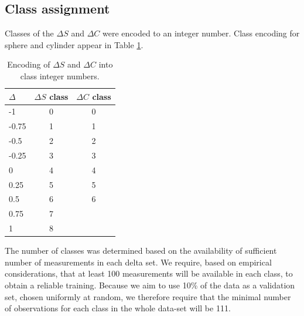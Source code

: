 \documentclass[article,twocolumn,preprint,10pt]{paper}%
\renewcommand{\(}{\left(}
\renewcommand{\)}{\right)}
\renewcommand{\[}{\left[}
\renewcommand{\]}{\right]}
\newcommand{\1}{\mbox{\boldmath$1$}}
\begin{document}
   \subsection{Class assignment}\label{subsection:ClassAssignment}
   Classes of the $\Delta S$ and $\Delta C$ were encoded to an integer number. Class encoding for sphere and cylinder appear in Table \ref{table:classEncoding}.
   \begin{table}
   	\begin{tabular}{l|c|c}
   		$\Delta$ & $\Delta S$ class & $\Delta C$ class \\
   		\hline 
   		-1        & 0 & 0\\
   		-0.75   & 1  & 1\\
   		-0.5    & 2  & 2\\
   		-0.25  & 3  & 3\\
   		0        & 4   & 4\\
   		0.25   & 5   & 5\\
   		0.5     & 6   & 6\\
   		0.75   & 7    &  \\
   		1        & 8    &  \\
   		\end{tabular}
   	\caption{Encoding of $\Delta S$ and $\Delta C$ into class integer numbers.}
   	\label{table:classEncoding}
   	\end{table}
   
   The number of classes was determined based on the availability of sufficient number of measurements in each delta set. We require, based on empirical considerations, that at least 100 measurements will be available in each class, to obtain a reliable training.  Because we aim to use 10\% of the data as a validation set, chosen uniformly at random, we therefore require that the minimal number of observations for each class in the whole data-set will be 111. 
\end{document}
